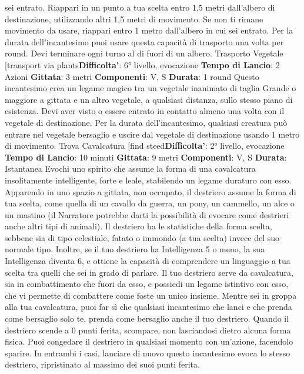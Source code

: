\begin{multicols}{2}
sei entrato. Riappari in un punto a tua scelta entro 1,5
metri dall’albero di destinazione, utilizzando altri 1,5
metri di movimento. Se non ti rimane movimento da
usare, riappari entro 1 metro dall’albero in cui sei
entrato.
Per la durata dell’incantesimo puoi usare questa
capacità di trasporto una volta per round. Devi
terminare ogni turno al di fuori di un albero.
Trasporto Vegetale
[transport via plants\textbf{Difficolta'}:
6° livello, evocazione
\textbf{Tempo di Lancio}: 2 Azioni
\textbf{Gittata}: 3 metri
\textbf{Componenti}: V, S
\textbf{Durata}: 1 round
Questo incantesimo crea un legame magico tra un
vegetale inanimato di taglia Grande o maggiore a
gittata e un altro vegetale, a qualsiasi distanza, sullo
stesso piano di esistenza. Devi aver visto o essere
entrato in contatto almeno una volta con il vegetale di
destinazione. Per la durata dell’incantesimo, qualsiasi
creatura può entrare nel vegetale bersaglio e uscire dal
vegetale di destinazione usando 1 metro di
movimento.
Trova Cavalcatura
[find steed\textbf{Difficolta'}:
2° livello, evocazione
\textbf{Tempo di Lancio}: 10 minuti
\textbf{Gittata}: 9 metri
\textbf{Componenti}: V, S
\textbf{Durata}: Istantanea
Evochi uno spirito che assume la forma di una
cavalcatura insolitamente intelligente, forte e leale,
stabilendo un legame duraturo con esso. Apparendo in
uno spazio a gittata, non occupato, il destriero assume
la forma di tua scelta, come quella di un cavallo da
guerra, un pony, un cammello, un alce o un mastino (il
Narratore potrebbe darti la possibilità di evocare come
destrieri anche altri tipi di animali). Il destriero ha le
statistiche della forma scelta, sebbene sia di tipo
celestiale, fatato o immondo (a tua scelta) invece del
suo normale tipo. Inoltre, se il tuo destriero ha
Intelligenza 5 o meno, la sua Intelligenza diventa 6, e
ottiene la capacità di comprendere un linguaggio a tua
scelta tra quelli che sei in grado di parlare.
Il tuo destriero serve da cavalcatura, sia in
combattimento che fuori da esso, e possiedi un legame
istintivo con esso, che vi permette di combattere come
foste un unico insieme. Mentre sei in groppa alla tua
cavalcatura, puoi far sì che qualsiasi incantesimo che
lanci e che prenda come bersaglio solo te, prenda
come bersaglio anche il tuo destriero.
Quando il destriero scende a 0 punti ferita, scompare,
non lasciandosi dietro alcuna forma fisica. Puoi
congedare il destriero in qualsiasi momento con
un’azione, facendolo sparire. In entrambi i casi, lanciare
di nuovo questo incantesimo evoca lo stesso destriero,
ripristinato al massimo dei suoi punti ferita.

\end{multicols}
